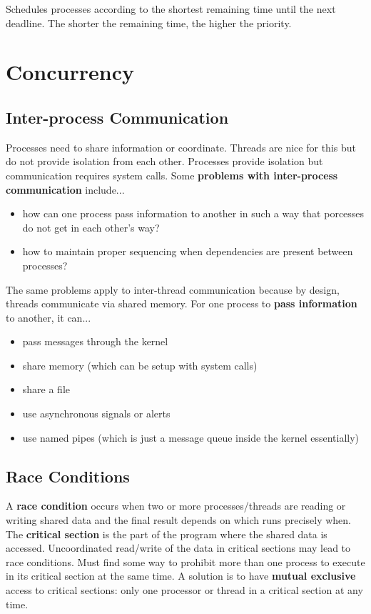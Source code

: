 \documentclass{article}
\newcommand{\bold}[1]{\textbf{#1}}
\renewcommand{\b}{\item[$\circ$]}
\newcommand{\newlist}{\begin{itemize}}
\renewcommand{\endlist}{\end{itemize}}
\begin{document}
    Schedules processes according to the shortest remaining time until the next deadline. The shorter the remaining time, the higher the priority. 

\section{Concurrency}

\subsection{Inter-process Communication}

    Processes need to share information or coordinate. Threads are nice for this but do not provide isolation from each other. Processes provide isolation but communication requires system calls. Some \bold{problems with inter-process communication} include...

    \newlist
    \b how can one process pass information to another in such a way that porcesses do not get in each other's way?
    \b how to maintain proper sequencing when dependencies are present between processes?
    \endlist 

    \noindent The same problems apply to inter-thread communication because by design, threads communicate via shared memory. For one process to \bold{pass information} to another, it can...

    \newlist
    \b pass messages through the kernel
    \b share memory (which can be setup with system calls)
    \b share a file 
    \b use asynchronous signals or alerts
    \b use named pipes (which is just a message queue inside the kernel essentially)
    \endlist 
    
\subsection{Race Conditions}

    A \bold{race condition} occurs when two or more processes/threads are reading or writing shared data and the final result depends on which runs precisely when. The \bold{critical section} is the part of the program where the shared data is accessed. Uncoordinated read/write of the data in critical sections may lead to race conditions. Must find some way to prohibit more than one process to execute in its critical section at the same time. A solution is to have \bold{mutual exclusive} access to critical sections: only one processor or thread in a critical section at any time. 
\end{document}
